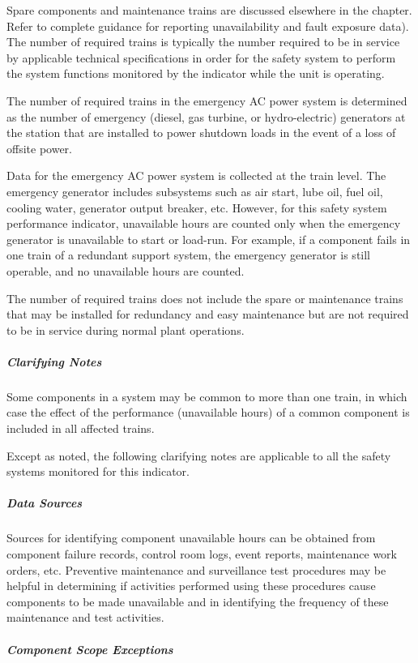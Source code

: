 Spare components and maintenance trains are discussed elsewhere in the
chapter.  Refer to complete guidance for reporting unavailability and
fault exposure data).  The number of required trains is typically the
number required to be in service by applicable technical
specifications in order for the safety system to perform the system
functions monitored by the indicator while the unit is operating.

The number of required trains in the emergency AC power system is
determined as the number of emergency (diesel, gas turbine, or
hydro-electric) generators at the station that are installed to power
shutdown loads in the event of a loss of offsite power.

Data for the emergency AC power system is collected at the train
level. The emergency generator includes subsystems such as air start,
lube oil, fuel oil, cooling water, generator output breaker,
etc. However, for this safety system performance indicator,
unavailable hours are counted only when the emergency generator is
unavailable to start or load-run. For example, if a component fails in
one train of a redundant support system, the emergency generator is
still operable, and no unavailable hours are counted.

The number of required trains does not include the spare or
maintenance trains that may be installed for redundancy and easy
maintenance but are not required to be in service during normal plant
operations.

\subparagraph{Clarifying Notes}

Some components in a system may be common to more than one train, in
which case the effect of the performance (unavailable hours) of a
common component is included in all affected trains.

Except as noted, the following clarifying notes are applicable to all
the safety systems monitored for this indicator.

\subparagraph{Data Sources}

Sources for identifying component unavailable hours can be obtained
from component failure records, control room logs, event reports,
maintenance work orders, etc. Preventive maintenance and surveillance
test procedures may be helpful in determining if activities performed
using these procedures cause components to be made unavailable and in
identifying the frequency of these maintenance and test activities.

\subparagraph{Component Scope Exceptions}

